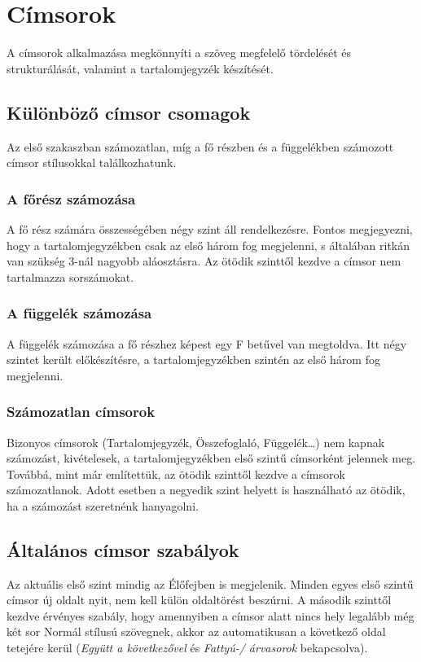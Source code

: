 \documentclass[a4paper, 12pt]{article}
\begin{document}
	\section{Címsorok}
	A címsorok alkalmazása megkönnyíti a szöveg megfelelő tördelését és strukturálását, valamint a tartalomjegyzék készítését.
	\subsection{Különböző címsor csomagok}
	Az első szakaszban számozatlan, míg a fő részben és a függelékben számozott címsor stílusokkal találkozhatunk.
	\subsubsection{A főrész számozása}
	A fő rész számára összességében négy szint áll rendelkezésre.
	Fontos megjegyezni, hogy a tartalomjegyzékben csak az első három fog megjelenni, s általában ritkán van szükség 3-nál nagyobb aláosztásra.
	Az ötödik szinttől kezdve a címsor nem tartalmazza sorszámokat.
	\subsubsection{A függelék számozása}
	A függelék számozása a fő részhez képest egy F betűvel van megtoldva.
	Itt négy szintet került előkészítésre, a tartalomjegyzékben szintén az első három fog megjelenni.
	\subsubsection{Számozatlan címsorok}
	Bizonyos címsorok (Tartalomjegyzék, Összefoglaló, Függelék…) nem kapnak számozást, kivételesek, a tartalomjegyzékben első szintű címsorként jelennek meg.
	Továbbá, mint már említettük, az ötödik szinttől kezdve a címsorok számozatlanok. Adott esetben a negyedik szint helyett is használható az ötödik, ha a számozást szeretnénk hanyagolni.
	\subsection{Általános címsor szabályok}
	Az aktuális első szint mindig az Élőfejben is megjelenik.
	Minden egyes első szintű címsor új oldalt nyit, nem kell külön oldaltörést beszúrni.
	A második szinttől kezdve érvényes szabály, hogy amennyiben a címsor alatt nincs hely legalább még két sor Normál stílusú szövegnek, akkor az automatikusan a következő oldal tetejére kerül (\textit{\textcolor{bme}{Együtt a következővel}} és \textit{\textcolor{bme}{Fattyú-/ árvasorok}} bekapcsolva).
	\newpage
\end{document}
